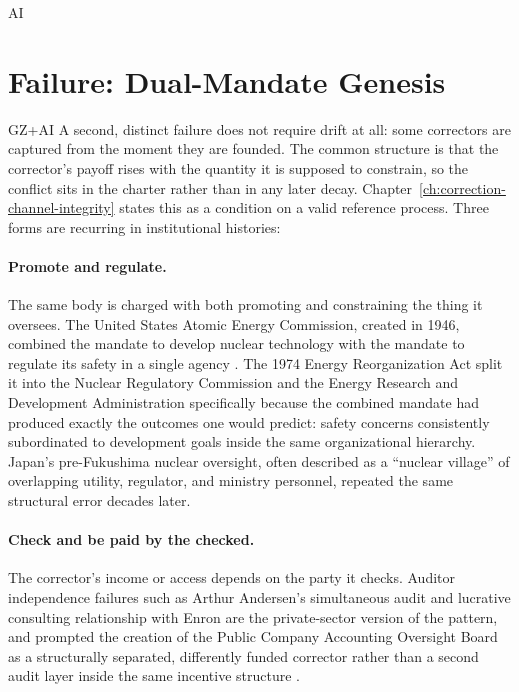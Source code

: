 \begin{refsection}
\begin{authbar}{AI}
\end{authbar}
\authbarneedspace
\section{Failure: Dual-Mandate Genesis}
\label{sec:appm-dual-mandate}
\begin{authbar}{GZ+AI}
A second, distinct failure does not require drift at all: some correctors are captured from the moment they are founded. 
The common structure is that the corrector's payoff rises with the quantity it is supposed to constrain, so the conflict sits in the charter rather than in any later decay. Chapter~\ref{ch:correction-channel-integrity} states this as a condition on a valid reference process. Three forms are recurring in institutional histories:

\paragraph{Promote and regulate.} The same body is charged with both promoting and constraining the thing it oversees. The United States Atomic Energy Commission, created in 1946, combined the mandate to develop nuclear technology with the mandate to regulate its safety in a single agency \autocite{mazuzan1985atom}. The 1974 Energy Reorganization Act split it into the Nuclear Regulatory Commission and the Energy Research and Development Administration specifically because the combined mandate had produced exactly the outcomes one would predict: safety concerns consistently subordinated to development goals inside the same organizational hierarchy. Japan's pre-Fukushima nuclear oversight, often described as a ``nuclear village'' of overlapping utility, regulator, and ministry personnel, repeated the same structural error decades later.

\paragraph{Check and be paid by the checked.} The corrector's income or access depends on the party it checks. Auditor independence failures such as Arthur Andersen's simultaneous audit and lucrative consulting relationship with Enron are the private-sector version of the pattern, and prompted the creation of the Public Company Accounting Oversight Board as a structurally separated, differently funded corrector rather than a second audit layer inside the same incentive structure \autocite{coffee2006gatekeepers}.


\end{authbar}
\end{refsection}
